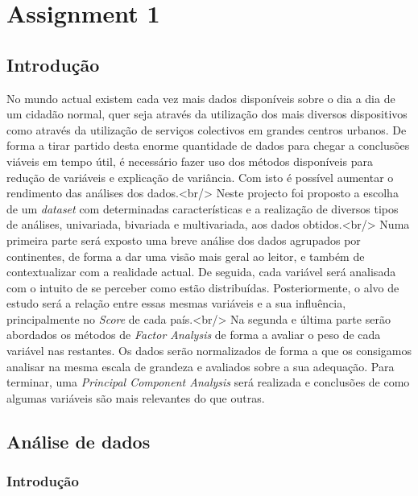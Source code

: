 \documentclass[]{article}
\date{}
\begin{document}
\hypertarget{header-n2}{%
\section{Assignment 1}\label{header-n2}}

\hypertarget{header-n3}{%
\subsection{Introdução}\label{header-n3}}

No mundo actual existem cada vez mais dados disponíveis sobre o dia a
dia de um cidadão normal, quer seja através da utilização dos mais
diversos dispositivos como através da utilização de serviços colectivos
em grandes centros urbanos. De forma a tirar partido desta enorme
quantidade de dados para chegar a conclusões viáveis em tempo útil, é
necessário fazer uso dos métodos disponíveis para redução de variáveis e
explicação de variância. Com isto é possível aumentar o rendimento das
análises dos dados.\textless{}br/\textgreater{} Neste projecto foi
proposto a escolha de um \emph{dataset} com determinadas características
e a realização de diversos tipos de análises, univariada, bivariada e
multivariada, aos dados obtidos.\textless{}br/\textgreater{} Numa
primeira parte será exposto uma breve análise dos dados agrupados por
continentes, de forma a dar uma visão mais geral ao leitor, e também de
contextualizar com a realidade actual. De seguida, cada variável será
analisada com o intuito de se perceber como estão distribuídas.
Posteriormente, o alvo de estudo será a relação entre essas mesmas
variáveis e a sua influência, principalmente no \emph{Score} de cada
país.\textless{}br/\textgreater{} Na segunda e última parte serão
abordados os métodos de \emph{Factor Analysis} de forma a avaliar o peso
de cada variável nas restantes. Os dados serão normalizados de forma a
que os consigamos analisar na mesma escala de grandeza e avaliados sobre
a sua adequação. Para terminar, uma \emph{Principal Component Analysis}
será realizada e conclusões de como algumas variáveis são mais
relevantes do que outras.

\hypertarget{header-n5}{%
\subsection{Análise de dados}\label{header-n5}}

\hypertarget{header-n6}{%
\subsubsection{Introdução}\label{header-n6}}
\end{document}
